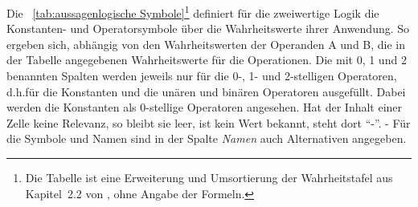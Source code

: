 \documentclass[english,ngerman,parskip=half,headsepline,footsepline]{scrreprt}
\makeatletter
\newcommand{\textdh}{d.\@ h.\@}
\makeatother
\begin{document}
	Die \tablename~\vref{tab:aussagenlogische Symbole}\footnote{ Die Tabelle ist eine Erweiterung und Umsortierung der Wahrheitstafel aus Kapitel~2.2 von \cite{bib:Junktor}, ohne Angabe der Formeln.} definiert für die zweiwertige Logik die Konstanten- und Operatorsymbole über die Wahrheitswerte ihrer Anwendung. So ergeben sich, abhängig von den Wahrheitswerten der Operanden A und B, die in der Tabelle angegebenen Wahrheitswerte für die Operationen. Die mit 0, 1 und 2 benannten Spalten werden jeweils nur für die 0-, 1- und 2-stelligen Operatoren, \textdh für die Konstanten und die unären und binären Operatoren ausgefüllt. Dabei werden die Konstanten als 0-stellige Operatoren angesehen. Hat der Inhalt einer Zelle keine Relevanz, so bleibt sie leer, ist kein Wert bekannt, steht dort "`-"'. - Für die Symbole und Namen sind in der Spalte \emph{Namen} auch Alternativen angegeben.
\end{document}
